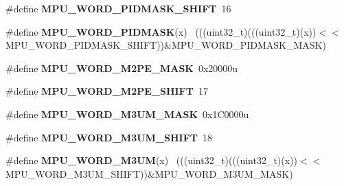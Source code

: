 \begin{DoxyCompactItemize}
\item 
\hypertarget{group___m_p_u___register___masks_ga8e8598cc55665f9c06a95b86700f7c59}{}\#define {\bfseries M\+P\+U\+\_\+\+W\+O\+R\+D\+\_\+\+P\+I\+D\+M\+A\+S\+K\+\_\+\+S\+H\+I\+F\+T}~16\label{group___m_p_u___register___masks_ga8e8598cc55665f9c06a95b86700f7c59}

\item 
\hypertarget{group___m_p_u___register___masks_gaaf207e49f9d267d1f7721b835e14f955}{}\#define {\bfseries M\+P\+U\+\_\+\+W\+O\+R\+D\+\_\+\+P\+I\+D\+M\+A\+S\+K}(x)                                        ~(((uint32\+\_\+t)(((uint32\+\_\+t)(x))$<$$<$M\+P\+U\+\_\+\+W\+O\+R\+D\+\_\+\+P\+I\+D\+M\+A\+S\+K\+\_\+\+S\+H\+I\+F\+T))\&M\+P\+U\+\_\+\+W\+O\+R\+D\+\_\+\+P\+I\+D\+M\+A\+S\+K\+\_\+\+M\+A\+S\+K)\label{group___m_p_u___register___masks_gaaf207e49f9d267d1f7721b835e14f955}

\item 
\hypertarget{group___m_p_u___register___masks_ga8b8927a9e9cd3cda870cec0d466f068b}{}\#define {\bfseries M\+P\+U\+\_\+\+W\+O\+R\+D\+\_\+\+M2\+P\+E\+\_\+\+M\+A\+S\+K}~0x20000u\label{group___m_p_u___register___masks_ga8b8927a9e9cd3cda870cec0d466f068b}

\item 
\hypertarget{group___m_p_u___register___masks_ga36dd5e4e8ba83049c95bd912a2cf275f}{}\#define {\bfseries M\+P\+U\+\_\+\+W\+O\+R\+D\+\_\+\+M2\+P\+E\+\_\+\+S\+H\+I\+F\+T}~17\label{group___m_p_u___register___masks_ga36dd5e4e8ba83049c95bd912a2cf275f}

\item 
\hypertarget{group___m_p_u___register___masks_gaaae46e6e46ff4089de2e00ef4f10396f}{}\#define {\bfseries M\+P\+U\+\_\+\+W\+O\+R\+D\+\_\+\+M3\+U\+M\+\_\+\+M\+A\+S\+K}~0x1\+C0000u\label{group___m_p_u___register___masks_gaaae46e6e46ff4089de2e00ef4f10396f}

\item 
\hypertarget{group___m_p_u___register___masks_ga2256d09a97da4bc4e20aceefdd6870f1}{}\#define {\bfseries M\+P\+U\+\_\+\+W\+O\+R\+D\+\_\+\+M3\+U\+M\+\_\+\+S\+H\+I\+F\+T}~18\label{group___m_p_u___register___masks_ga2256d09a97da4bc4e20aceefdd6870f1}

\item 
\hypertarget{group___m_p_u___register___masks_ga4613804e66aa7ba84932de4f06b9eaf6}{}\#define {\bfseries M\+P\+U\+\_\+\+W\+O\+R\+D\+\_\+\+M3\+U\+M}(x)                                              ~(((uint32\+\_\+t)(((uint32\+\_\+t)(x))$<$$<$M\+P\+U\+\_\+\+W\+O\+R\+D\+\_\+\+M3\+U\+M\+\_\+\+S\+H\+I\+F\+T))\&M\+P\+U\+\_\+\+W\+O\+R\+D\+\_\+\+M3\+U\+M\+\_\+\+M\+A\+S\+K)\label{group___m_p_u___register___masks_ga4613804e66aa7ba84932de4f06b9eaf6}


\end{DoxyCompactItemize}

